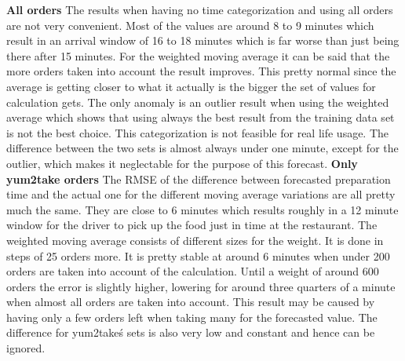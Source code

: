 \newline\textbf{All orders}\newline
The results when having no time categorization and using all orders are not very convenient. Most of the values are around 8 to 9 minutes which result in an arrival window of 16 to 18 minutes which is far worse than just being there after 15 minutes. For the weighted moving average it can be said that the more orders taken into account the result improves. This pretty normal since the average is getting closer to what it actually is the bigger the set of values for calculation gets. The only anomaly is an outlier result when using the weighted average which shows that using always the best result from the training data set is not the best choice. This categorization is not feasible for real life usage.\newline
The difference between the two sets is almost always under one minute, except for the outlier, which makes it neglectable for the purpose of this forecast.
\newline\newline\textbf{Only yum2take orders}\newline
The RMSE of the difference between forecasted preparation time and the actual one for the different moving average variations are all pretty much the same. They are close to 6 minutes which results roughly in a 12 minute window for the driver to pick up the food just in time at the restaurant. The weighted moving average consists of different sizes for the weight. It is done in steps of 25 orders more. It is pretty stable at around 6 minutes when under 200 orders are taken into account of the calculation. Until a weight of around 600 orders the error is slightly higher, lowering for around three quarters of a minute when almost all orders are taken into account. This result may be caused by having only a few orders left when taking many for the forecasted value.\newline
The difference for yum2take\'s sets is also very low and constant and hence can be ignored.
